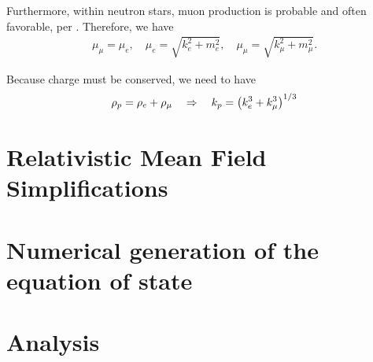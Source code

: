 Furthermore, within neutron stars, muon production is probable and often favorable, per \autocite[p. 90]{diener_2008}. Therefore, we have
\begin{align}
    \mu_\mu = \mu_e,\quad \mu_e  = \sqrt{k_e^2 + m_e^2}, \quad \mu_\mu  = \sqrt{k_\mu^2 + m_\mu^2}.
\end{align}

Because charge must be conserved, we need to have
\begin{align}
    \rho_p = \rho_e + \rho_\mu \goesto k_p = \pqty{k_e^3 + k_\mu^3}^{1/3}
\end{align}

\section{Relativistic Mean Field Simplifications}
\section{Numerical generation of the equation of state}
\section{Analysis}